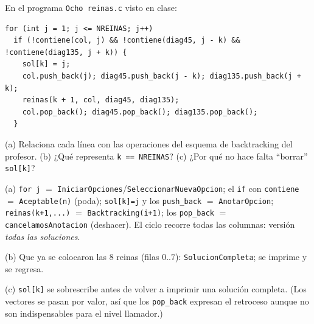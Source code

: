 \begin{prob}
En el programa \texttt{Ocho reinas.c} visto en clase:
\begin{lstlisting}
for (int j = 1; j <= NREINAS; j++)
  if (!contiene(col, j) && !contiene(diag45, j - k) && !contiene(diag135, j + k)) {
    sol[k] = j;
    col.push_back(j); diag45.push_back(j - k); diag135.push_back(j + k);
    reinas(k + 1, col, diag45, diag135);
    col.pop_back(); diag45.pop_back(); diag135.pop_back();
  }
\end{lstlisting}
(a) Relaciona cada línea con las operaciones del esquema de backtracking del profesor. (b) ¿Qué representa \texttt{k == NREINAS}? (c) ¿Por qué no hace falta ``borrar'' \texttt{sol[k]}?
\end{prob}
\begin{sol}
(a) \texttt{for j} $=$ \texttt{IniciarOpciones}/\texttt{SeleccionarNuevaOpcion}; el \texttt{if} con \texttt{contiene} $=$ \texttt{Aceptable(n)} (poda); \texttt{sol[k]=j} y los \texttt{push\_back} $=$ \texttt{AnotarOpcion}; \texttt{reinas(k+1,...)} $=$ \texttt{Backtracking(i+1)}; los \texttt{pop\_back} $=$ \texttt{cancelamosAnotacion} (deshacer). El ciclo recorre todas las columnas: versión \emph{todas las soluciones}.

(b) Que ya se colocaron las 8 reinas (filas $0..7$): \texttt{SolucionCompleta}; se imprime y se regresa.

(c) \texttt{sol[k]} se sobrescribe antes de volver a imprimir una solución completa. (Los vectores se pasan por valor, así que los \texttt{pop\_back} expresan el retroceso aunque no son indispensables para el nivel llamador.)
\end{sol}

